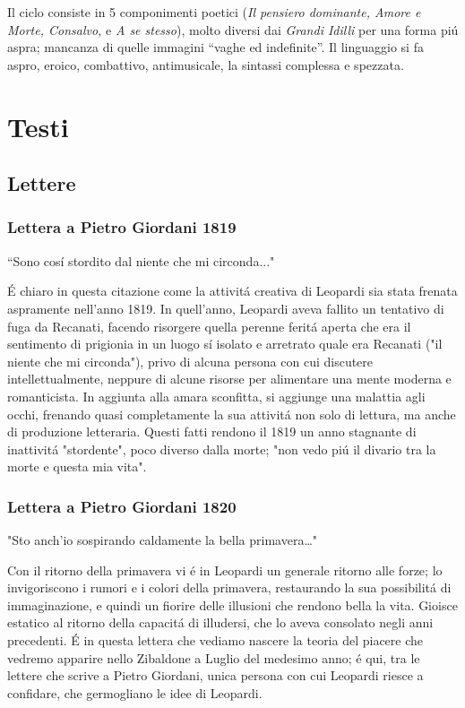 \documentclass{report}
\begin{document}
Il ciclo consiste in 5 componimenti poetici (\emph{Il pensiero dominante, Amore e Morte, Consalvo,} e \emph{A se stesso}), molto diversi dai \emph{Grandi Idilli} per una forma piú aspra; mancanza di quelle immagini ``vaghe ed indefinite''. Il linguaggio si fa aspro, eroico, combattivo, antimusicale, la sintassi complessa e spezzata.
\chapter{Testi}
\section{Lettere}
\subsection*{Lettera a Pietro Giordani 1819}
``Sono cosí stordito dal niente che mi circonda..."

É chiaro in questa citazione come la attivitá creativa di Leopardi sia stata frenata aspramente nell'anno 1819. In quell'anno, Leopardi aveva fallito un tentativo di fuga da Recanati, facendo risorgere quella perenne feritá aperta che era il sentimento di prigionia in un luogo sí isolato e arretrato quale era Recanati ("il niente che mi circonda"), privo di alcuna persona con cui discutere intellettualmente, neppure di alcune risorse per alimentare una mente moderna e romanticista. In aggiunta alla amara sconfitta, si aggiunge una malattia agli occhi, frenando quasi completamente la sua attivitá non solo di lettura, ma anche di produzione letteraria. Questi fatti rendono il 1819 un anno stagnante di inattivitá "stordente", poco diverso dalla morte; "non vedo piú il divario tra la morte e questa mia vita".
\subsection*{Lettera a Pietro Giordani 1820}
"Sto anch'io sospirando caldamente la bella primavera\dots"

Con il ritorno della primavera vi é in Leopardi un generale ritorno alle forze; lo invigoriscono i rumori e i colori della primavera, restaurando la sua possibilitá di immaginazione, e quindi un fiorire delle illusioni che rendono bella la vita. Gioisce estatico al ritorno della capacitá di illudersi, che lo aveva consolato negli anni precedenti. É in questa lettera che vediamo nascere la teoria del piacere che vedremo apparire nello Zibaldone a Luglio del medesimo anno; é qui, tra le lettere che scrive a Pietro Giordani, unica persona con cui Leopardi riesce a confidare, che germogliano le idee di Leopardi.
\end{document}
